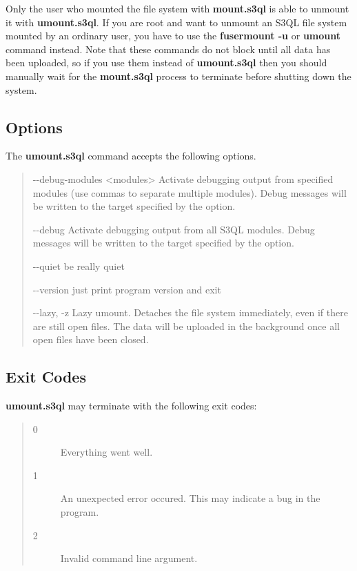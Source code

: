\documentclass[letterpaper,10pt,english]{sphinxmanual}
\begin{document}
Only the user who mounted the file system with \textbf{mount.s3ql}
is able to unmount it with \textbf{umount.s3ql}. If you are root and want to
unmount an S3QL file system mounted by an ordinary user, you have to
use the \textbf{fusermount -u} or \textbf{umount} command instead.
Note that these commands do not block until all data has been
uploaded, so if you use them instead of \textbf{umount.s3ql} then
you should manually wait for the \textbf{mount.s3ql} process to
terminate before shutting down the system.


\subsection{Options}
\label{man/umount:options}
The \textbf{umount.s3ql} command accepts the following options.
\begin{quote}
\begin{optionlist}{3cm}
\item [-{-}debug-modules \textless{}modules\textgreater{}]  
Activate debugging output from specified modules (use
commas to separate multiple modules). Debug messages
will be written to the target specified by the
 option.
\item [-{-}debug]  
Activate debugging output from all S3QL modules. Debug
messages will be written to the target specified by
the  option.
\item [-{-}quiet]  
be really quiet
\item [-{-}version]  
just print program version and exit
\item [-{-}lazy, -z]  
Lazy umount. Detaches the file system immediately,
even if there are still open files. The data will be
uploaded in the background once all open files have
been closed.
\end{optionlist}
\end{quote}


\subsection{Exit Codes}
\label{man/umount:exit-codes}
\textbf{umount.s3ql} may terminate with the following exit codes:
\begin{quote}\begin{description}
\item[{0}] \leavevmode
Everything went well.

\item[{1}] \leavevmode
An unexpected error occured. This may indicate a bug in the
program.

\item[{2}] \leavevmode
Invalid command line argument.

\end{description}\end{quote}
\end{document}
